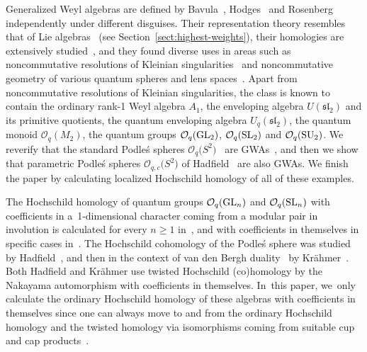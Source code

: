 \documentclass[pdftex]{sigma}
\newcommand{\G}[1]{\mathfrak{#1}}
\newcommand{\C}[1]{\mathcal{#1}}
\renewcommand{\geq}{\geqslant}
\numberwithin{equation}{section}
\begin{document}
Generalized Weyl algebras are defined by Bavula~\cite{Bavula:GWAI, Bavula:GlobalDim},
Hodges~\cite{Hodges:NCDeformations} and Rosenberg~\cite{Rosenber:NCAlgebraicGeometry} independently
under different disguises. Their representation theory resembles that of Lie
algebras~\cite{DGO:WeightModules, Meinel:DufloTheorem} (see Section~\ref{sect:highest-weights}),
their homologies are extensively studied~\cite{FarinatiSolotarAlvarez:GeneralizedWeyAlgebras, Liu:HomologicalSmoothnessI,
 Liu:HomologicalSmoothnessII,
 SolotarAlvarezVivas:QuantumGeneralizedWeyl}, and they found diverse uses in areas such as noncommutative
resolutions of Kleinian
singularities~\cite{Boddington:ResolutionOfTypeD,crawley-boevey1998,Levy:2009} and noncommutative
geometry of various quantum spheres and lens spaces~\cite{Brzezinski:GWAs}. Apart from
noncommutative resolutions of Kleinian singularities, the class is known to contain the ordinary
rank-1 Weyl algebra $A_1$, the enveloping algebra $U(\G{sl}_2)$ and its primitive quotients, the
quantum enveloping algebra $U_q(\G{sl}_2)$, the quantum monoid $\C{O}_q(M_2)$, the quantum groups
$\C{O}_q({\rm GL}_2)$, $\C{O}_q({\rm SL}_2)$ and $\C{O}_q({\rm SU}_2)$. We reverify that the standard Podle\'s spheres
$\C{O}_q\bigl(S^2\bigr)$~\cite{Podl87} are GWAs~\cite{Liu:HomologicalSmoothnessI}, and then we show that
parametric Podle\'s spheres $\C{O}_{q,c}\bigl(S^2\bigr)$ of Hadfield~\cite{Hadfield:Podles} are also GWAs. We
finish the paper by calculating localized Hochschild homology of all of these examples.

The Hochschild homology of quantum groups $\C{O}_q({\rm GL}_n)$ and $\C{O}_q({\rm SL}_n)$ with coefficients in a~1-dimensional character coming from a modular pair in involution is calculated for every $n\geq 1$
in~\cite{KaygunSutlu:HomologyOfQuantumLinearGroups}, and with coefficients in themselves in specific
cases in~\cite{HadfKrah05, HadfKrae06, MasuNakaWata90, Ross90}. The Hochschild cohomology of the
Podle\'s sphere was studied by Hadfield~\cite{Hadfield:Podles}, and then in the context of van den
Bergh duality~\cite{vdBer98, VanDenBergh:HochschildPoicareDualityErratum} by Kr\"ahmer~\cite{Krah08}.
Both Hadfield and Kr\"ahmer use twisted Hochschild (co)homology by the Nakayama automorphism with
coefficients in themselves. In~this paper, we~only calculate the ordinary Hochschild homology of
these algebras with coefficients in themselves since one can always move to and from the ordinary
Hochschild homology and the twisted homology via isomorphisms coming from suitable cup and cap
products~\cite{GoodKrah14,Krah08}.
\end{document}
